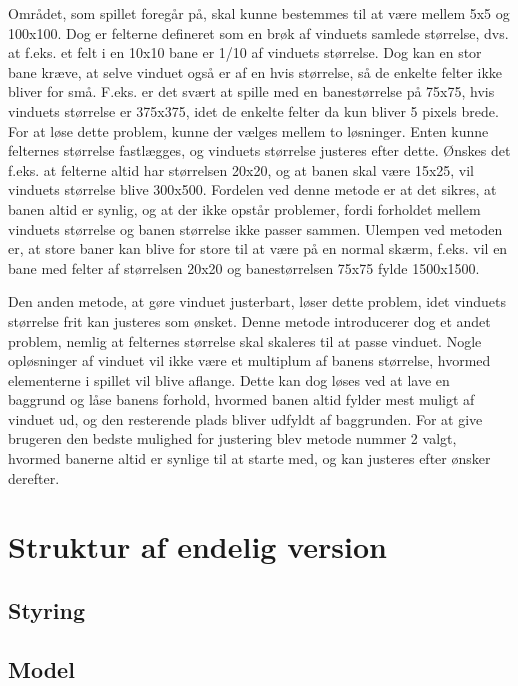 \documentclass{report}
\begin{document}
Området, som spillet foregår på, skal kunne bestemmes til at være mellem 5x5 og 100x100. Dog er felterne defineret som en brøk af vinduets samlede størrelse, dvs. at f.eks. et felt i en 10x10 bane er 1/10 af vinduets størrelse. Dog kan en stor bane kræve, at selve vinduet også er af en hvis størrelse, så de enkelte felter ikke bliver for små. F.eks. er det svært at spille med en banestørrelse på 75x75, hvis vinduets størrelse er 375x375, idet de enkelte felter da kun bliver 5 pixels brede. For at løse dette problem, kunne der vælges mellem to løsninger. Enten kunne felternes størrelse fastlægges, og vinduets størrelse justeres efter dette. Ønskes det f.eks. at felterne altid har størrelsen 20x20, og at banen skal være 15x25, vil vinduets størrelse blive 300x500. Fordelen ved denne metode er at det sikres, at banen altid er synlig, og at der ikke opstår problemer, fordi forholdet mellem vinduets størrelse og banen størrelse ikke passer sammen. Ulempen ved metoden er, at store baner kan blive for store til at være på en normal skærm, f.eks. vil en bane med felter af størrelsen 20x20 og banestørrelsen 75x75 fylde 1500x1500.

Den anden metode, at gøre vinduet justerbart, løser dette problem, idet vinduets størrelse frit kan justeres som ønsket. Denne metode introducerer dog et andet problem, nemlig at felternes størrelse skal skaleres til at passe vinduet. Nogle opløsninger af vinduet vil ikke være et multiplum af banens størrelse, hvormed elementerne i spillet vil blive aflange. Dette kan dog løses ved at lave en baggrund og låse banens forhold, hvormed banen altid fylder mest muligt af vinduet ud, og den resterende plads bliver udfyldt af baggrunden.
For at give brugeren den bedste mulighed for justering blev metode nummer 2 valgt, hvormed banerne altid er synlige til at starte med, og kan justeres efter ønsker derefter.

\section{Struktur af endelig version}

\subsection{Styring}

\subsection{Model}
\end{document}
